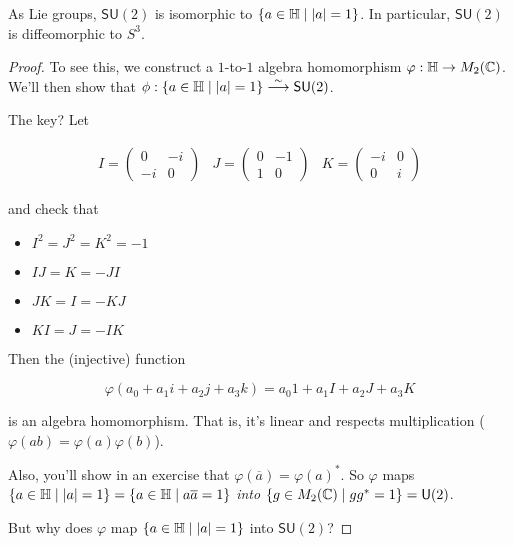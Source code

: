 \documentclass[../main.tex]{subfiles}
\begin{document}
\begin{thm}
  As Lie groups, $\mathsf{SU}(2)$ is isomorphic to $\{a \in \mathbb{H} \mid \left \lvert a \right \rvert = 1 \}$.
  In particular, $\mathsf{SU}(2)$ is diffeomorphic to $S^3$.
\end{thm}

\begin{proof}
  To see this, we construct a $1$-to-$1$ algebra homomorphism 
  $\varphi : \mathbb{H} \to M_2(\mathbb{C})$. We'll then show that 
  $\phi : \{ a \in \mathbb{H} \mid \left \lvert a \right \rvert = 1 \} \overset{\sim}{\longrightarrow} \mathsf{SU}(2)$.

  The key? Let 

  \begin{align*}
    I = \begin{pmatrix} 0 & -i \\ -i & 0 \end{pmatrix} &
    J = \begin{pmatrix} 0 & -1 \\  1 & 0 \end{pmatrix} &
    K = \begin{pmatrix} -i & 0 \\  0 & i \end{pmatrix}
  \end{align*}

  and check that 

  \begin{itemize}
      \item $I^2 = J^2 = K^2 = -1$
      \item $IJ = K = - JI$
      \item $JK = I = - KJ$
      \item $KI = J = - IK$
  \end{itemize}

  Then the (injective) function 

  \[ \varphi(a_0 + a_1 i + a_2 j + a_3 k) = a_0 1 + a_1 I + a_2 J + a_3 K \]

  is an algebra homomorphism. That is, it's linear and respects multiplication
  ($\varphi(ab) = \varphi(a) \varphi(b)$).

  Also, you'll show in an exercise that $\varphi(\overline{a}) = \varphi(a)^*$.
  So $\varphi$ maps 
  $\{ a \in \mathbb{H} \mid \left \lvert a \right \rvert = 1 \} = \{ a \in \mathbb{H} \mid a \overline{a} = 1 \}$ 
  \emph{into} $\{ g \in M_2(\mathbb{C}) \mid g g^* = 1 \} = \mathsf{U}(2)$.

  But why does $\varphi$ map $\{ a \in \mathbb{H} \mid \left \lvert a \right \rvert = 1\}$ into 
  $\mathsf{SU}(2)$?


\end{proof}
\end{document}
